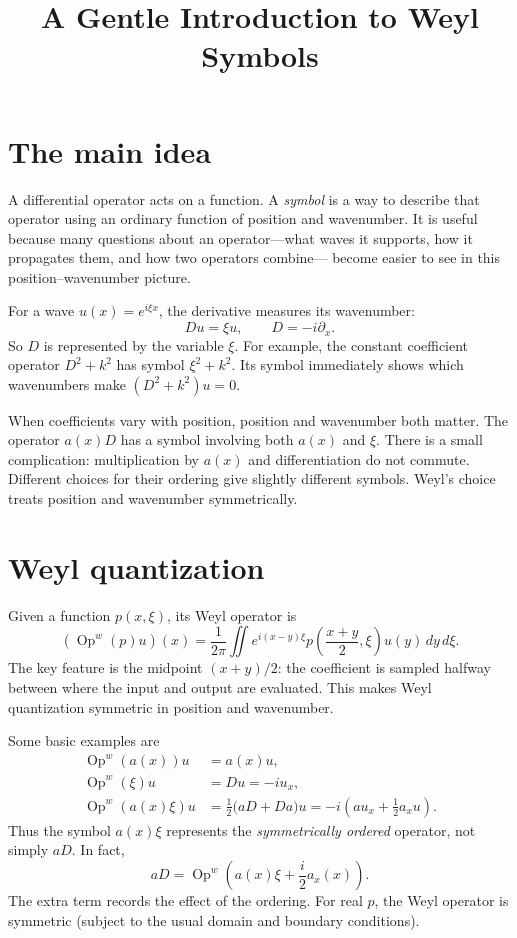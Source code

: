 \documentclass[11pt]{article}
\title{A Gentle Introduction to Weyl Symbols}
\author{}
\date{}
\newcommand{\Op}{\operatorname{Op}^{w}}
\newcommand{\pd}{\partial}
\begin{document}
\maketitle

\section{The main idea}

A differential operator acts on a function. A \emph{symbol} is a way to
describe that operator using an ordinary function of position and
wavenumber. It is useful because many questions about an operator---what
waves it supports, how it propagates them, and how two operators combine---
become easier to see in this position--wavenumber picture.

For a wave $u(x)=e^{i\xi x}$, the derivative measures its wavenumber:
\begin{equation}
  D u=\xi u,\qquad D=-i\pd_x.
\end{equation}
So $D$ is represented by the variable $\xi$. For example, the constant
coefficient operator $D^2+k^2$ has symbol $\xi^2+k^2$. Its symbol immediately
shows which wavenumbers make $(D^2+k^2)u=0$.

When coefficients vary with position, position and wavenumber both matter.
The operator $a(x)D$ has a symbol involving both $a(x)$ and $\xi$. There is a
small complication: multiplication by $a(x)$ and differentiation do not
commute. Different choices for their ordering give slightly different
symbols. Weyl's choice treats position and wavenumber symmetrically.

\section{Weyl quantization}

Given a function $p(x,\xi)$, its Weyl operator is
\begin{equation}\label{eq:weyl}
  (\Op(p)u)(x)=\frac{1}{2\pi}\iint
  e^{i(x-y)\xi}p\!\left(\frac{x+y}{2},\xi\right)u(y)\,dy\,d\xi.
\end{equation}
The key feature is the midpoint $(x+y)/2$: the coefficient is sampled
halfway between where the input and output are evaluated. This makes Weyl
quantization symmetric in position and wavenumber.

Some basic examples are
\begin{align}
  \Op(a(x))u &=a(x)u,\\
  \Op(\xi)u &=Du=-i u_x,\\
  \Op(a(x)\xi)u &=\frac12\bigl(aD+Da\bigr)u
    =-i\left(a u_x+\frac12a_xu\right).
\end{align}
Thus the symbol $a(x)\xi$ represents the \emph{symmetrically ordered}
operator, not simply $aD$. In fact,
\begin{equation}
  aD=\Op\!\left(a(x)\xi+\frac{i}{2}a_x(x)\right).
\end{equation}
The extra term records the effect of the ordering. For real $p$, the Weyl
operator is symmetric (subject to the usual domain and boundary conditions).
\end{document}
